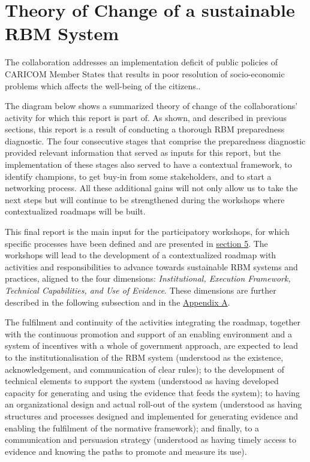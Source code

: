 \documentclass[
]{book}
\begin{document}
\hypertarget{theory-of-change-of-a-sustainable-rbm-system}{%
\section{Theory of Change of a sustainable RBM System}\label{theory-of-change-of-a-sustainable-rbm-system}}

The collaboration addresses an implementation deficit of public policies of CARICOM Member States that results in poor resolution of socio-economic problems which affects the well-being of the citizens..

The diagram below shows a summarized theory of change of the collaborations' activity for which this report is part of. As shown, and described in previous sections, this report is a result of conducting a thorough RBM preparedness diagnostic. The four consecutive stages that comprise the preparedness diagnostic provided relevant information that served as inputs for this report, but the implementation of these stages also served to have a contextual framework, to identify champions, to get buy-in from some stakeholders, and to start a networking process. All these additional gains will not only allow us to take the next steps but will continue to be strengthened during the workshops where contextualized roadmaps will be built.

This final report is the main input for the participatory workshops, for which specific processes have been defined and are presented in \protect\hyperlink{section5}{section 5}. The workshops will lead to the development of a contextualized roadmap with activities and responsibilities to advance towards sustainable RBM systems and practices, aligned to the four dimensions: \emph{Institutional, Execution Framework, Technical Capabilities, and Use of Evidence}. These dimensions are further described in the following subsection and in the \protect\hyperlink{appendixA}{Appendix A}.

The fulfilment and continuity of the activities integrating the roadmap, together with the continuous promotion and support of an enabling environment and a system of incentives with a whole of government approach, are expected to lead to the institutionalisation of the RBM system (understood as the existence, acknowledgement, and communication of clear rules); to the development of technical elements to support the system (understood as having developed capacity for generating and using the evidence that feeds the system); to having an organizational design and actual roll-out of the system (understood as having structures and processes designed and implemented for generating evidence and enabling the fulfilment of the normative framework); and finally, to a communication and persuasion strategy (understood as having timely access to evidence and knowing the paths to promote and measure its use).
\end{document}
